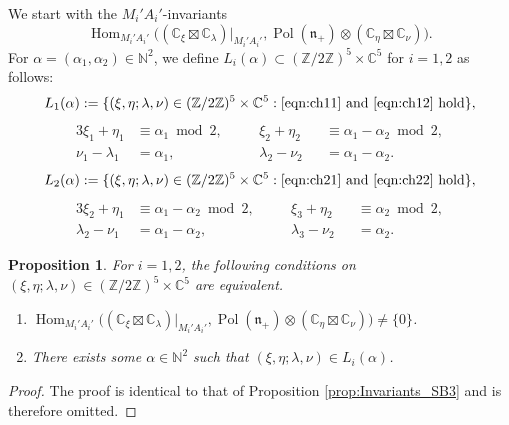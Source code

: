 \documentclass[a4paper,11pt,reqno]{amsart}
\newcommand{\frakn}{\mathfrak{n}}
\newcommand{\CC}{\mathbb{C}}
\newcommand{\NN}{\mathbb{N}}
\newcommand{\ZZ}{\mathbb{Z}}
\newcommand{\0}{{\bf 0}}
\newcommand{\N}{\mathbb{N}}
\newcommand{\1}{{\bf 1}}
\DeclareMathOperator{\Hom}{Hom}
\DeclareMathOperator{\Pol}{Pol}
\theoremstyle{plain}
\newtheorem{proposition}[equation]{Proposition}
\theoremstyle{definition}
\numberwithin{equation}{section}
\theoremstyle{definition}
\begin{document}
We start with 
the $M_i'A_i'$-invariants 
\begin{equation*}
\Hom_{M_i'A_i'}\big((\CC_\xi\boxtimes \CC_{\lambda})\big\rvert_{M_i'A_i'},\Pol(\frakn_+)\otimes (\CC_\eta\boxtimes \CC_{\nu})\big).
\end{equation*}
For $\alpha=(\alpha_1,\alpha_2) \in \N^2$, we define $L_i(\alpha) \subset (\ZZ/2\ZZ)^5\times \CC^5$
 for $i=1,2$ as follows:
\begin{equation*}
L_1(\alpha):=\{(\xi, \eta; \lambda, \nu) \in (\ZZ/2\ZZ)^5\times \CC^5: 
\text{\eqref{eqn:ch11} and \eqref{eqn:ch12} hold}  \},
\end{equation*}
\begin{alignat}{3}
\xi_1+\eta_1&\equiv \alpha_1 \bmod{2}, \quad &&\xi_2+\eta_2&&\equiv \alpha_1-\alpha_2 \bmod{2},
\label{eqn:ch11}\\[3pt]
\nu_1-\lambda_1&=\alpha_1, \quad &&\lambda_2-\nu_2&&=\alpha_1-\alpha_2.
\label{eqn:ch12}
\end{alignat}
\vspace{-5pt}
\begin{equation*}
L_2(\alpha):=\{(\xi, \eta; \lambda, \nu) \in (\ZZ/2\ZZ)^5\times \CC^5: 
\text{\eqref{eqn:ch21} and \eqref{eqn:ch22} hold}  \},
\end{equation*}
\begin{alignat}{3}
\xi_2+\eta_1&\equiv\alpha_1-\alpha_2 \bmod{2}, \quad &&
\xi_3+\eta_2&&\equiv \alpha_2 \bmod{2},
\label{eqn:ch21}\\[3pt]
 \lambda_2-\nu_1&=\alpha_1-\alpha_2, \quad &&\lambda_3-\nu_2&&=\alpha_2.
\label{eqn:ch22}
\end{alignat}


\begin{proposition}\label{prop:Invariants_SB12} 
For $i=1,2$,
the following conditions on $(\xi, \eta; \lambda, \nu)\in (\ZZ/2\ZZ)^5\times \CC^5$ are equivalent.
\begin{enumerate}[label=\normalfont{(\roman*)}]
    \item $\Hom_{M_i'A_i'}\big((\CC_\xi\boxtimes \CC_{\lambda})\big\rvert_{M_i'A_i'},\Pol(\frakn_+)\otimes (\CC_\eta\boxtimes \CC_{\nu})\big)\neq \{0\}$.
    \item There exists some $\alpha\in \NN^2$ such that 
    $(\xi, \eta; \lambda, \nu) \in L_i(\alpha)$.
\end{enumerate}
\end{proposition}

\begin{proof}
The proof is identical to that of Proposition \ref{prop:Invariants_SB3} and is therefore omitted.
\end{proof}
\end{document}
